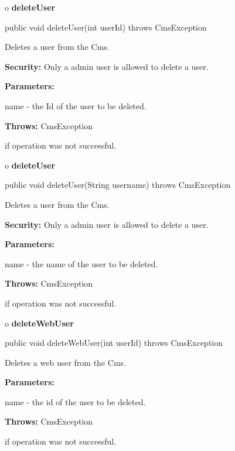 o {\bf deleteUser} 

\begin{PRE}
 public void deleteUser(int userId) throws CmsException
\end{PRE}

\begin{description}
\htmlDD Deletes a user from the Cms. 

{\bf Security:} Only a admin user is allowed to delete a user. 

\begin{description}
\item {\bf Parameters:}  

name - the Id of the user to be deleted.  
\item {\bf Throws:} CmsException  

if operation was not successful.  
\end{description}

\end{description}

o {\bf deleteUser} 

\begin{PRE}
 public void deleteUser(String username) throws CmsException
\end{PRE}

\begin{description}
\htmlDD Deletes a user from the Cms. 

{\bf Security:} Only a admin user is allowed to delete a user. 

\begin{description}
\item {\bf Parameters:}  

name - the name of the user to be deleted.  
\item {\bf Throws:} CmsException  

if operation was not successful.  
\end{description}

\end{description}

o {\bf deleteWebUser} 

\begin{PRE}
 public void deleteWebUser(int userId) throws CmsException
\end{PRE}

\begin{description}
\htmlDD Deletes a web user from the Cms. 

\begin{description}
\item {\bf Parameters:}  

name - the id of the user to be deleted.  
\item {\bf Throws:} CmsException  

if operation was not successful.  
\end{description}

\end{description}

